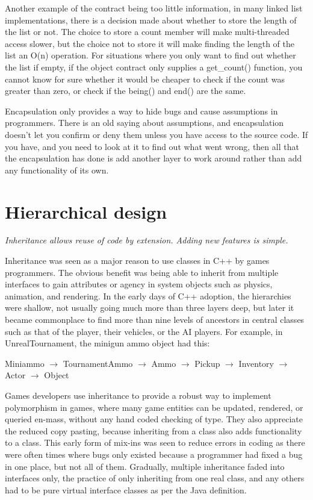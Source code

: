 Another example of the contract being too little information, in many linked
list implementations, there is a decision made about whether to store the
length of the list or not. The choice to store a count member will make
multi-threaded access slower, but the choice not to store it will make finding
the length of the list an O(n) operation. For situations where you only want to
find out whether the list if empty, if the object contract only supplies a
get\_count() function, you cannot know for sure whether it would be cheaper to
check if the count was greater than zero, or check if the being() and end() are
the same.

Encapsulation only provides a way to hide bugs and cause assumptions in
programmers. There is an old saying about assumptions, and encapsulation
doesn't let you confirm or deny them unless you have access to the source code.
If you have, and you need to look at it to find out what went wrong, then all
that the encapsulation has done is add another layer to work around rather than
add any functionality of its own.  

\section{Hierarchical design}
\emph{Inheritance allows reuse of code by extension.
Adding new features is simple.} \\ \hfill

Inheritance was seen as a major reason to use classes in C++ by games
programmers. The obvious benefit was being able to inherit from multiple
interfaces to gain attributes or agency in system objects such as physics,
animation, and rendering. In the early days of C++ adoption, the hierarchies
were shallow, not usually going much more than three layers deep, but later it
became commonplace to find more than nine levels of ancestors in central
classes such as that of the player, their vehicles, or the AI players. For
example, in UnrealTournament, the minigun ammo object had this:

Miniammo $\rightarrow$ TournamentAmmo $\rightarrow$ Ammo $\rightarrow$ Pickup $\rightarrow$ Inventory $\rightarrow$ Actor $\rightarrow$ Object

Games developers use inheritance to provide a robust way to implement
polymorphism in games, where many game entities can be updated, rendered, or
queried en-mass, without any hand coded checking of type. They also appreciate
the reduced copy pasting, because inheriting from a class also adds
functionality to a class. This early form of mix-ins was seen to reduce errors
in coding as there were often times where bugs only existed because a
programmer had fixed a bug in one place, but not all of them. Gradually,
multiple inheritance faded into interfaces only, the practice of only
inheriting from one real class, and any others had to be pure virtual interface
classes as per the Java definition.


